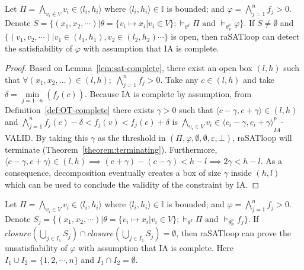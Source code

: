 \begin{theorem}
Let $\Pi = \bigwedge\limits_{v_i \in V} v_i \in \langle l_i, h_i \rangle$ where $\langle l_i, h_i \rangle \in \mathbb{I}$ is bounded; and ${\varphi = \bigwedge\limits_{j = 1}^n f_j > 0}$. Denote $S = \{(x_1, x_2, \cdots) | \theta = \{v_i \mapsto x_i | v_i \in V \}; \models_{\theta^I} \Pi \text{ and } \models_{\theta^p_\mathbb{R}}\varphi \}$. If $S \neq \emptyset$ and $\{(v_1, v_2, \cdots) | v_1 \in (l_1, h_1), v_2 \in (l_2, h_2) \cdots \}$ is open, then raSATloop can detect the satisfiability of $\varphi$ with assumption that IA is complete.
\end{theorem}


\begin{proof}
Based on Lemma~\ref{lem:sat-complete}, there exist an open box $(l, h)$ such that $\forall (x_1, x_2, ...) \in (l, h); \; \bigwedge\limits_{j=1}^n f_j > 0 $. Take any $c \in (l, h)$ and take $\delta = \min\limits_{j = 1\cdots n}(f_j(c))$. Because IA is complete by assumption, from Definition~\ref{def:OT-complete} there exists $\gamma > 0$ such that $\langle c - \gamma, c + \gamma \rangle \in (l, h)$ and $\bigwedge\limits_{j = 1}^n f_j(c) - \delta < f_j(v) < f_j(c) + \delta$ is ${\bigwedge\limits_{v_i \in V}v_i \in \langle c_i - \gamma, c_i + \gamma \rangle}^p_{IA}$-VALID. By taking this $\gamma$ as the threshold in $(\Pi, \varphi, \emptyset, \emptyset, \varepsilon, \bot)$, raSATloop will terminate (Theorem~\ref{theorem:terminating}). Furthermore, $\langle c - \gamma, c + \gamma \rangle \in (l, h) \implies (c + \gamma) - (c - \gamma) < h - l \implies 2\gamma < h - l$. As a consequence, decomposition eventually creates a box of size $\gamma$ inside $(h, l)$ which can be used to conclude the validity of the constraint by IA.
\end{proof}


\begin{theorem}
\sloppy
Let $\Pi = \bigwedge\limits_{v_i \in V} v_i \in \langle l_i, h_i \rangle$ where $\langle l_i, h_i \rangle \in \mathbb{I}$ is bounded; and ${\varphi = \bigwedge\limits_{j = 1}^n f_j > 0}$. Denote $S_j = \{(x_1, x_2, \cdots) | \theta = \{v_i \mapsto x_i | v_i \in V \};\models_{\theta^I} \Pi \text{ and } \models_{\theta^p_\mathbb{R}}f_j \}$. If ${closure(\bigcup\limits_{j \in I_1}S_j) \cap closure(\bigcup\limits_{j \in I_2}S_j) = \emptyset}$, then raSATloop can prove the unsatisfiability of $\varphi$ with assumption that IA is complete. Here $I_1 \cup I_2 = \{1, 2, \cdots, n\}$ and $I_1 \cap I_2 = \emptyset$.
\end{theorem}


